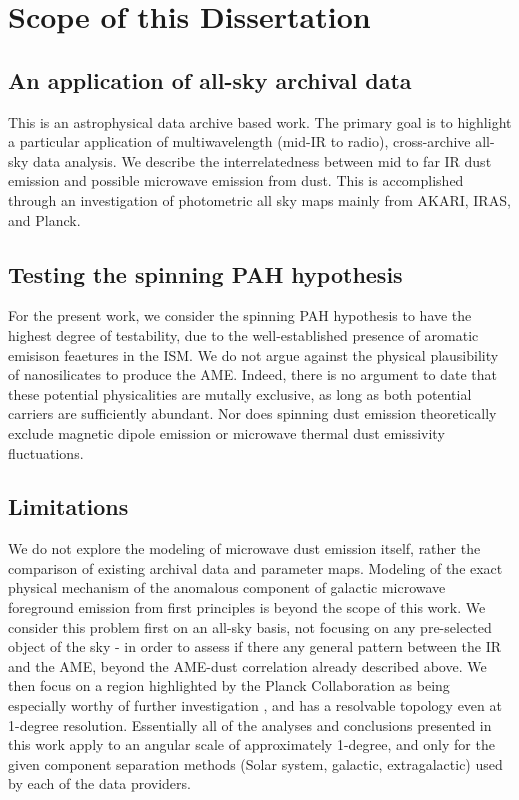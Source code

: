 \section{Scope of this Dissertation}

  \subsection{An application of all-sky archival data}
    This is an astrophysical data archive based work. The primary goal is to highlight a particular application of multiwavelength (mid-IR to radio), cross-archive all-sky data analysis. We describe the interrelatedness between mid to far IR dust emission and possible microwave emission from dust. This is accomplished through an investigation of photometric all sky maps mainly from AKARI, IRAS, and Planck.

  \subsection{Testing the spinning PAH hypothesis}
    For the present work, we consider the spinning PAH hypothesis to have the highest degree of testability, due to the well-established presence of aromatic emisison feaetures in the ISM.  We do not argue against the physical plausibility of nanosilicates to produce the AME. Indeed, there is no argument to date that these potential physicalities are mutally exclusive, as long as both potential carriers are sufficiently abundant. Nor does spinning dust emission theoretically exclude magnetic dipole emission or microwave thermal dust emissivity fluctuations.

  \subsection{Limitations}
    We do not explore the modeling of microwave dust emission itself, rather the comparison of existing archival data and parameter maps. Modeling of the exact physical mechanism of the anomalous component of galactic microwave foreground emission from first principles is beyond the scope of this work. We consider this problem first on an all-sky basis, not focusing on any pre-selected object of the sky - in order to assess if there any general pattern between the IR and the AME, beyond the AME-dust correlation already described above. We then focus on a region highlighted by the Planck Collaboration as being especially worthy of further investigation \citep{planck15X}, and has a resolvable topology even at 1-degree resolution. Essentially all of the analyses and conclusions presented in this work apply to an angular scale of approximately 1-degree, and only for the given component separation methods (Solar system, galactic, extragalactic) used by each of the data providers.

